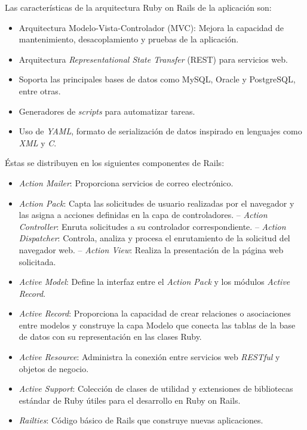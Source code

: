 Las características de la arquitectura Ruby on Rails de la aplicación son:
\begin{itemize}
\item Arquitectura Modelo-Vista-Controlador (MVC): Mejora la capacidad de mantenimiento, desacoplamiento y pruebas de la aplicación.
\item Arquitectura \textit{Representational State Transfer} (REST) para servicios web.
\item Soporta las principales bases de datos como MySQL, Oracle y PostgreSQL, entre otras.
\item Generadores de \textit{scripts} para automatizar tareas.
\item Uso de \textit{YAML}, formato de serialización de datos inspirado en lenguajes como \textit{XML} y \textit{C}.
\end{itemize}

Éstas se distribuyen en los siguientes componentes de Rails:
\begin{itemize}
\item \textit{Action Mailer}: Proporciona servicios de correo electrónico. 
\item \textit{Action Pack}: Capta las solicitudes de usuario realizadas por el navegador y las asigna a acciones definidas en la capa de controladores.
\subitem-- \textit{Action Controller}: Enruta solicitudes a su controlador correspondiente. 
\subitem-- \textit{Action Dispatcher}: Controla, analiza y procesa el enrutamiento de la solicitud del navegador web.
\subitem-- \textit{Action View}: Realiza la presentación de la página web solicitada.
\item \textit{Active Model}: Define la interfaz entre el \textit{Action Pack} y los módulos \textit{Active Record}.
\item \textit{Active Record}: Proporciona la capacidad de crear relaciones o asociaciones entre modelos y construye la capa Modelo que conecta las tablas de la base de datos con su representación en las clases Ruby.
\item \textit{Active Resource}: Administra la conexión entre servicios web \textit{RESTful} y objetos de negocio.
\item \textit{Active Support}: Colección de clases de utilidad y extensiones de bibliotecas estándar de Ruby útiles para el desarrollo en Ruby on Rails.
\item \textit{Railties}: Código básico de Rails que construye nuevas aplicaciones. 
\end{itemize}	 

